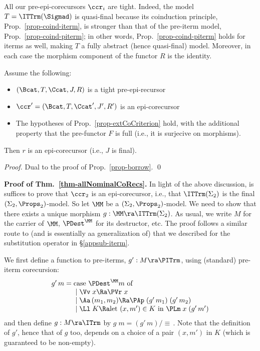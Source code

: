 All our pre-epi-corecursors $\ccr_i$ %
are tight. 
Indeed, the model $T=\ITTrm(\Sigmad)$ is quasi-final because its coinduction principle,  Prop.~\ref{prop-coind-iterm}, is stronger than 
that of the pre-iterm model, Prop.~\ref{prop-coind-piterm}; in other words, Prop.~\ref{prop-coind-piterm} holds for iterms as well, making 
$T$ a fully abstract (hence quasi-final) model. 
Moreover, in each case the morphism component of the functor $R$ is the identity. 

\begin{prop}\rm \label{prop-Coborrow} 
	Assume the following:
	\begin{itemize}
		\item $(\Bcat,T,\Ccat,J,R)$  is a tight pre-epi-recursor
		\item $\ccr'= (\Bcat,T,\Ccat',J',R') $ is an epi-corecursor
		\item The hypotheses of
		Prop.~\ref{prop-extCoCriterion} 
		hold, with the additional property that the pre-functor $F$ is full (i.e., it is surjecive on morphisms). 
	\end{itemize}
	
	Then $r$ is an epi-corecursor (i.e., $J$ is final).  
\end{prop} 
\begin{proof}
	Dual to the proof of Prop.~\ref{prop-borrow}. \qed 
\end{proof}
\medskip 


\textbf{Proof of Thm.~\ref{thm-allNominalCoRecs}.}   
In light of the above discussion, is suffices to prove that $\ccr_2$ is an epi-corecursor, i.e., that $\ITTrm(\Sigma_2)$ is the final  $(\Sigma_2,\Props_2)$-model. So let $\MM$ be a $(\Sigma_2,\Props_2)$-model. We need to show that there exists a unique morphism $g : \MM \ra \ITTrm(\Sigma_2)$. 
As usual, we write $M$ for the carrier of $\MM$, $\PDest^\MM$ for its destructor, etc. 
The proof follows a similar route to (and is essentially aa generalization of) that we described for 
the substitution operator in \S\ref{appsub-iterm}. 

We first define a function to pre-iterms, $g' : M \ra \PITrm$, using (standard) pre-iterm corecursion: 
$$
\begin{array}{l}
g'\,m = \mbox{case $\PDest^\MM m$ of}
\\
\hspace*{8ex}\mid \Vv\;x \Ra \PVr\;x
\\
\hspace*{8ex}\mid \Aa\,(m_1,m_2) \Ra \PAp\;(g'\,m_1)\;(g'\,m_2)
\\
\hspace*{8ex}\mid \Ll\;K \Ra 
\mbox{let $(x,m') \in K$ in }
\PLm\;x\;(g'\,m') 
\end{array} 
$$
and then define $g : M \ra \ITrm$ by $g\;m = (g'\,m)/\equiv\,$. 
%
Note that the definition of $g'$, hence that of $g$ too, depends on a choice of a pair $(x,m')$ in $K$ (which is guaranteed to be non-empty).


